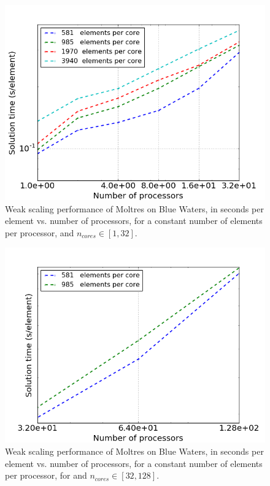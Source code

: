 \documentclass{anstrans}
\begin{document}
\begin{figure}[htpb]
  \centering
  \includegraphics[width=\linewidth]{intra-node_weak.png}
  \caption{Weak scaling performance of Moltres on Blue Waters, in seconds per element vs. number of processors, for a constant number of elements
        per processor, and $n_{cores}\in[1,32]$.}
  \label{fig:intra_weak}
\end{figure}

\begin{figure}[htpb]
  \centering
  \includegraphics[width=\linewidth]{extra-node_weak.png}
  \caption{Weak scaling performance of Moltres on Blue Waters, in seconds per element vs. number of processors, for a constant number of elements
        per processor, for and $n_{cores}\in[32,128]$.}
  \label{fig:extra_weak}
\end{figure}
\end{document}
